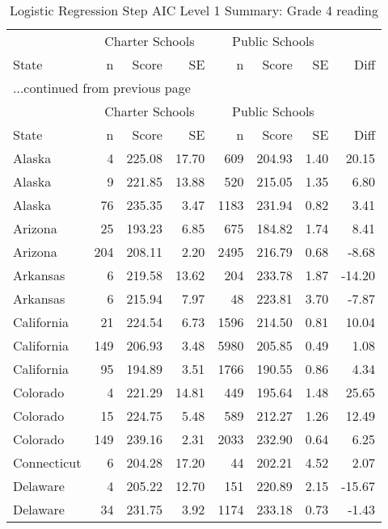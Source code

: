 \begin{longtable}{lrrr@{\extracolsep{10pt}}rrrr}
\caption{Logistic Regression Step AIC Level 1 Summary: Grade 4 reading} \\ 
  \hline
  & \multicolumn{3}{c}{Charter Schools} & \multicolumn{3}{c}{Public Schools} & \\ \cline{2-4} \cline{5-7} State & n & Score & SE & n & Score & SE & Diff \\ \endfirsthead \multicolumn{8}{l}{{...continued from previous page}}\\ \hline & \multicolumn{3}{c}{Charter Schools} & \multicolumn{3}{c}{Public Schools} & \\ \cline{2-4} \cline{5-7} State & n & Score & SE & n & Score & SE & Diff \\ \hline \endhead \hline \endfoot \endlastfoot \hline
Alaska &   4 & 225.08 & 17.70 & 609 & 204.93 & 1.40 & 20.15 \\ 
  Alaska &   9 & 221.85 & 13.88 & 520 & 215.05 & 1.35 & 6.80 \\ 
  Alaska &  76 & 235.35 & 3.47 & 1183 & 231.94 & 0.82 & 3.41 \\ 
  Arizona &  25 & 193.23 & 6.85 & 675 & 184.82 & 1.74 & 8.41 \\ 
  Arizona & 204 & 208.11 & 2.20 & 2495 & 216.79 & 0.68 & -8.68 \\ 
  Arkansas &   6 & 219.58 & 13.62 & 204 & 233.78 & 1.87 & -14.20 \\ 
  Arkansas &   6 & 215.94 & 7.97 &  48 & 223.81 & 3.70 & -7.87 \\ 
  California &  21 & 224.54 & 6.73 & 1596 & 214.50 & 0.81 & 10.04 \\ 
  California & 149 & 206.93 & 3.48 & 5980 & 205.85 & 0.49 & 1.08 \\ 
  California &  95 & 194.89 & 3.51 & 1766 & 190.55 & 0.86 & 4.34 \\ 
  Colorado &   4 & 221.29 & 14.81 & 449 & 195.64 & 1.48 & 25.65 \\ 
  Colorado &  15 & 224.75 & 5.48 & 589 & 212.27 & 1.26 & 12.49 \\ 
  Colorado & 149 & 239.16 & 2.31 & 2033 & 232.90 & 0.64 & 6.25 \\ 
  Connecticut &   6 & 204.28 & 17.20 &  44 & 202.21 & 4.52 & 2.07 \\ 
  Delaware &   4 & 205.22 & 12.70 & 151 & 220.89 & 2.15 & -15.67 \\ 
  Delaware &  34 & 231.75 & 3.92 & 1174 & 233.18 & 0.73 & -1.43 \\ 

\end{longtable}
